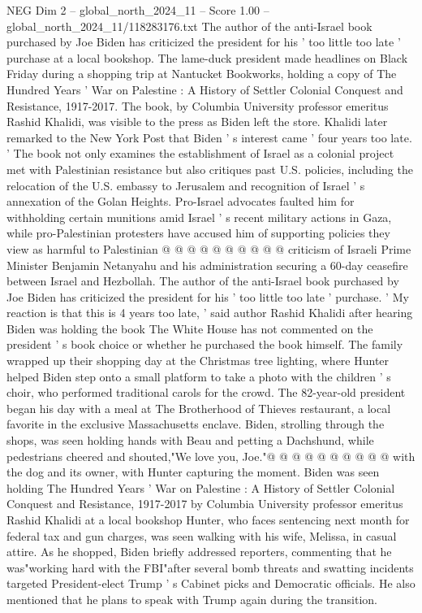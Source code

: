 \begin{textsample}{NEG Dim 2 – global\_north\_2024\_11 – Score 1.00 – global\_north\_2024\_11/118283176.txt}  \label{ex:f2_neg_187}
The author of the anti-Israel book purchased by Joe Biden has criticized the president for his ' too little too late ' purchase at a local bookshop.
The lame-duck president made headlines on Black Friday during a shopping trip at Nantucket Bookworks, holding a copy of The Hundred Years ' War on Palestine : A History of Settler Colonial Conquest and Resistance, 1917-2017.
The book, by Columbia University professor emeritus Rashid Khalidi, was visible to the press as Biden left the store.
Khalidi later remarked to the New York Post that Biden ' s interest came ' four years too late. ' The book not only examines the establishment of Israel as a colonial project met with Palestinian resistance but also critiques past U.S. policies, including the relocation of the U.S. embassy to Jerusalem and recognition of Israel ' s annexation of the Golan Heights.
Pro-Israel advocates faulted him for withholding certain munitions amid Israel ' s recent military actions in Gaza, while pro-Palestinian protesters have accused him of supporting policies they view as harmful to Palestinian @ @ @ @ @ @ @ @ @ @ criticism of Israeli Prime Minister Benjamin Netanyahu and his administration securing a 60-day ceasefire between Israel and Hezbollah.
The author of the anti-Israel book purchased by Joe Biden has criticized the president for his ' too little too late ' purchase. ' My reaction is that this is 4 years too late, ' said author Rashid Khalidi after hearing Biden was holding the book The White House has not commented on the president ' s book choice or whether he purchased the book himself.
The family wrapped up their shopping day at the Christmas tree lighting, where Hunter helped Biden step onto a small platform to take a photo with the children ' s choir, who performed traditional carols for the crowd.
The 82-year-old president began his day with a meal at The Brotherhood of Thieves restaurant, a local favorite in the exclusive Massachusetts enclave.
Biden, strolling through the shops, was seen holding hands with Beau and petting a Dachshund, while pedestrians cheered and shouted,"We love you, Joe."@ @ @ @ @ @ @ @ @ @ with the dog and its owner, with Hunter capturing the moment.
Biden was seen holding The Hundred Years ' War on Palestine : A History of Settler Colonial Conquest and Resistance, 1917-2017 by Columbia University professor emeritus Rashid Khalidi at a local bookshop Hunter, who faces sentencing next month for federal tax and gun charges, was seen walking with his wife, Melissa, in casual attire.
As he shopped, Biden briefly addressed reporters, commenting that he was"working hard with the FBI"after several bomb threats and swatting incidents targeted President-elect Trump ' s Cabinet picks and Democratic officials.
He also mentioned that he plans to speak with Trump again during the transition.

\end{textsample}
